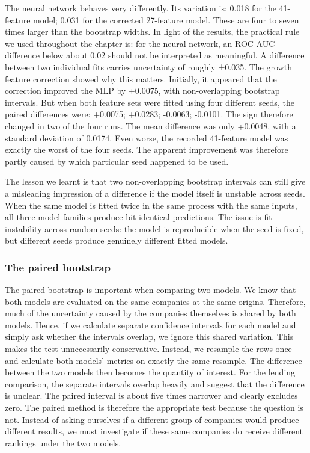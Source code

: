 \documentclass[    author={Samuel Menon Demelo; Sneha Saphala Ram Prasad; 
Viktor Ander Lindholm; Vishal Khatri},
               supervisor={Prof. Fernando Moreno-Pino},
                   degree={MSc},
                    title={Lloyds Commercial Banking Intelligence},
                 subtitle={Ranking SME Lending, Risk and Growth Prospects for Lloyds Banking Group},
                     type={},
                     year={2026}]{dissertation}
\begin{document}
The neural network behaves very differently. Its variation is: 0.018 for the 41-feature model; 0.031 for the corrected 27-feature model. These are four to seven times larger than the bootstrap widths. In light of the results, the practical rule we used throughout the chapter is: for the neural network, an ROC-AUC difference below about 0.02 should not be interpreted as meaningful. A difference between two individual fits carries uncertainty of roughly ±0.035. The growth feature correction showed why this matters. Initially, it appeared that the correction improved the MLP by +0.0075, with non-overlapping bootstrap intervals. But when both feature sets were fitted using four different seeds, the paired differences were: +0.0075; +0.0283; -0.0063; -0.0101. The sign therefore changed in two of the four runs. The mean difference was only +0.0048, with a standard deviation of 0.0174. Even worse, the recorded 41-feature model was exactly the worst of the four seeds. The apparent improvement was therefore partly caused by which particular seed happened to be used.

The lesson we learnt is that two non-overlapping bootstrap intervals can still give a misleading impression of a difference if the model itself is unstable across seeds. When the same model is fitted twice in the same process with the same inputs, all three model families produce bit-identical predictions. The issue is fit instability across random seeds: the model is reproducible when the seed is fixed, but different seeds produce genuinely different fitted models.

\subsubsection{The paired bootstrap}
The paired bootstrap is important when comparing two models. We know that both models are evaluated on the same companies at the same origins. Therefore, much of the uncertainty caused by the companies themselves is shared by both models. Hence, if we calculate separate confidence intervals for each model and simply ask whether the intervals overlap, we ignore this shared variation. This makes the test unnecessarily conservative. Instead, we resample the rows once and calculate both models' metrics on exactly the same resample. The difference between the two models then becomes the quantity of interest. For the lending comparison, the separate intervals overlap heavily and suggest that the difference is unclear. The paired interval is about five times narrower and clearly excludes zero. The paired method is therefore the appropriate test because the question is not. Instead of asking ourselves if a different group of companies would produce different results, we must investigate if these same companies do receive different rankings under the two models.
\end{document}

